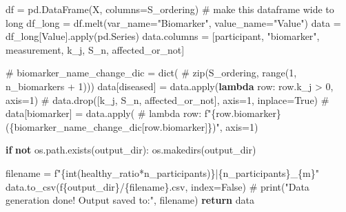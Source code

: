 \documentclass[
  letterpaper,
  DIV=11,
  numbers=noendperiod]{scrreprt}
\newenvironment{Shaded}{\begin{snugshade}}{\end{snugshade}}
\newcommand{\BuiltInTok}[1]{\textcolor[rgb]{0.00,0.23,0.31}{#1}}
\newcommand{\CommentTok}[1]{\textcolor[rgb]{0.37,0.37,0.37}{#1}}
\newcommand{\ControlFlowTok}[1]{\textcolor[rgb]{0.00,0.23,0.31}{\textbf{#1}}}
\newcommand{\DecValTok}[1]{\textcolor[rgb]{0.68,0.00,0.00}{#1}}
\newcommand{\KeywordTok}[1]{\textcolor[rgb]{0.00,0.23,0.31}{\textbf{#1}}}
\newcommand{\NormalTok}[1]{\textcolor[rgb]{0.00,0.23,0.31}{#1}}
\newcommand{\OperatorTok}[1]{\textcolor[rgb]{0.37,0.37,0.37}{#1}}
\newcommand{\SpecialCharTok}[1]{\textcolor[rgb]{0.37,0.37,0.37}{#1}}
\newcommand{\SpecialStringTok}[1]{\textcolor[rgb]{0.13,0.47,0.30}{#1}}
\newcommand{\StringTok}[1]{\textcolor[rgb]{0.13,0.47,0.30}{#1}}
\newcommand{\VariableTok}[1]{\textcolor[rgb]{0.07,0.07,0.07}{#1}}
\begin{document}
\begin{Shaded}
\begin{Highlighting}[]
\NormalTok{    df }\OperatorTok{=}\NormalTok{ pd.DataFrame(X, columns}\OperatorTok{=}\NormalTok{S\_ordering)}
    \CommentTok{\# make this dataframe wide to long}
\NormalTok{    df\_long }\OperatorTok{=}\NormalTok{ df.melt(var\_name}\OperatorTok{=}\StringTok{"Biomarker"}\NormalTok{, value\_name}\OperatorTok{=}\StringTok{"Value"}\NormalTok{)}
\NormalTok{    data }\OperatorTok{=}\NormalTok{ df\_long[}\StringTok{\textquotesingle{}Value\textquotesingle{}}\NormalTok{].}\BuiltInTok{apply}\NormalTok{(pd.Series)}
\NormalTok{    data.columns }\OperatorTok{=}\NormalTok{ [}\StringTok{\textquotesingle{}participant\textquotesingle{}}\NormalTok{, }\StringTok{"biomarker"}\NormalTok{,}
                    \StringTok{\textquotesingle{}measurement\textquotesingle{}}\NormalTok{, }\StringTok{\textquotesingle{}k\_j\textquotesingle{}}\NormalTok{, }\StringTok{\textquotesingle{}S\_n\textquotesingle{}}\NormalTok{, }\StringTok{\textquotesingle{}affected\_or\_not\textquotesingle{}}\NormalTok{]}

    \CommentTok{\# biomarker\_name\_change\_dic = dict(}
    \CommentTok{\#     zip(S\_ordering, range(1, n\_biomarkers + 1)))}
\NormalTok{    data[}\StringTok{\textquotesingle{}diseased\textquotesingle{}}\NormalTok{] }\OperatorTok{=}\NormalTok{ data.}\BuiltInTok{apply}\NormalTok{(}\KeywordTok{lambda}\NormalTok{ row: row.k\_j }\OperatorTok{\textgreater{}} \DecValTok{0}\NormalTok{, axis}\OperatorTok{=}\DecValTok{1}\NormalTok{)}
    \CommentTok{\# data.drop([\textquotesingle{}k\_j\textquotesingle{}, \textquotesingle{}S\_n\textquotesingle{}, \textquotesingle{}affected\_or\_not\textquotesingle{}], axis=1, inplace=True)}
    \CommentTok{\# data[\textquotesingle{}biomarker\textquotesingle{}] = data.apply(}
    \CommentTok{\#     lambda row: f"\{row.biomarker\} (\{biomarker\_name\_change\_dic[row.biomarker]\})", axis=1)}

    \ControlFlowTok{if} \KeywordTok{not}\NormalTok{ os.path.exists(output\_dir):}
\NormalTok{        os.makedirs(output\_dir)}

\NormalTok{    filename }\OperatorTok{=} \SpecialStringTok{f"}\SpecialCharTok{\{}\BuiltInTok{int}\NormalTok{(healthy\_ratio}\OperatorTok{*}\NormalTok{n\_participants)}\SpecialCharTok{\}}\SpecialStringTok{|}\SpecialCharTok{\{}\NormalTok{n\_participants}\SpecialCharTok{\}}\SpecialStringTok{\_}\SpecialCharTok{\{}\NormalTok{m}\SpecialCharTok{\}}\SpecialStringTok{"}
\NormalTok{    data.to\_csv(}\SpecialStringTok{f\textquotesingle{}}\SpecialCharTok{\{}\NormalTok{output\_dir}\SpecialCharTok{\}}\SpecialStringTok{/}\SpecialCharTok{\{}\NormalTok{filename}\SpecialCharTok{\}}\SpecialStringTok{.csv\textquotesingle{}}\NormalTok{, index}\OperatorTok{=}\VariableTok{False}\NormalTok{)}
    \CommentTok{\# print("Data generation done! Output saved to:", filename)}
    \ControlFlowTok{return}\NormalTok{ data}
\end{Highlighting}
\end{Shaded}
\end{document}
